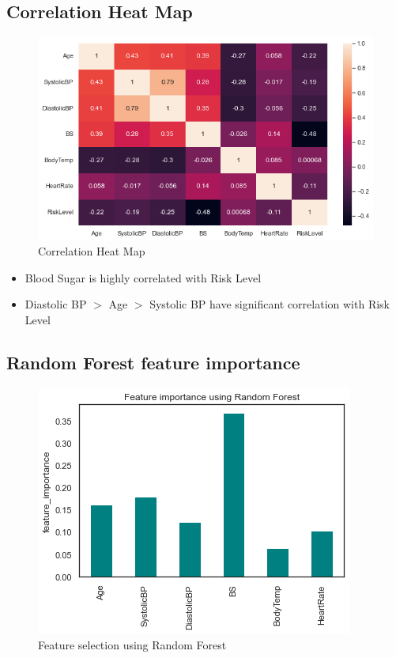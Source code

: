 \documentclass[12pt, letter]{article}
\begin{document}
\pagebreak

\noindent
\subsection{Correlation Heat Map}
\begin{figure}[h]
    \centering
    \includegraphics[scale = 0.5]{cor_heat_map.png}
    \caption{Correlation Heat Map}
    \label{corr_heat_MAp}
\end{figure}

\noindent
\begin{itemize}
    \item Blood Sugar is highly correlated with Risk Level 
    \item Diastolic BP $>$ Age $>$ Systolic BP have significant correlation with Risk Level
\end{itemize}

\noindent
\subsection{Random Forest feature importance}
\begin{figure}[h]
    \centering
    \includegraphics[scale = 0.7]{FS_imp.png}
    \caption{Feature selection using Random Forest}
    \label{FS_RF}
\end{figure}
\end{document}
